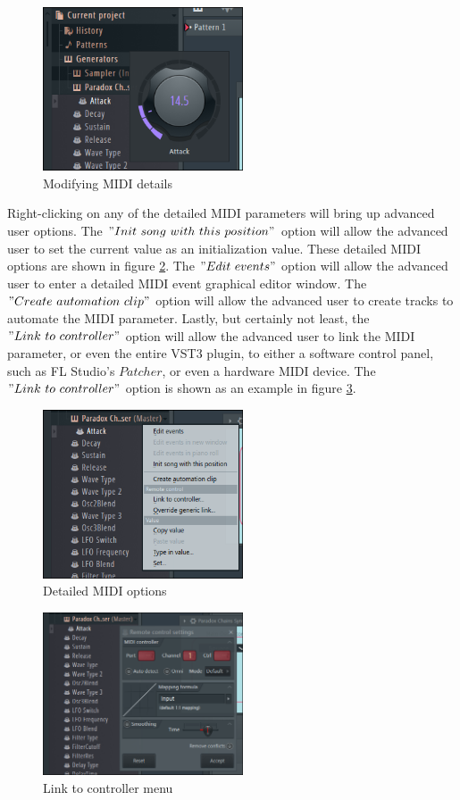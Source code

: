 \documentclass[a4paper,12pt]{report}
\begin{document}
\begin{figure}[h]
\centering
\includegraphics[width=16em]{ModifyingDetailedMIDI.png}
    \caption{Modifying MIDI details}     \label{fig:ModifyingDetailedMIDI}
\end{figure}

Right-clicking on any of the detailed MIDI parameters will bring up advanced user options. The $"Init\ \-song\ \-with\ \-this\ \-position"$ option will allow the advanced user to set the current value as an initialization value. These detailed MIDI options are shown in figure \ref{fig:ExtraOptions01}. The $"Edit\ \-events"$ option will allow the advanced user to enter a detailed MIDI event graphical editor window. The $"Create\ \-automation\ \-clip"$ option will allow the advanced user to create tracks to automate the MIDI parameter. Lastly, but certainly not least, the $"Link\ \-to\ \-controller"$ option will allow the advanced user to link the MIDI parameter, or even the entire VST3 plugin, to either a software control panel, such as FL Studio's $Patcher$, or even a hardware MIDI device. The $"Link\ \-to\ \-controller"$ option is shown as an example in figure \ref{fig:ExtraOptions02}.

\begin{figure}[h]
\centering
    \includegraphics[width=16em]{ExtraOptions01.png}
    \caption{Detailed MIDI options}     \label{fig:ExtraOptions01}
\end{figure}
\begin{figure}[h]
\centering
    \includegraphics[width=16em]{ExtraOptions02.png}
    \caption{Link to controller menu}     \label{fig:ExtraOptions02}
\end{figure}
\end{document}
